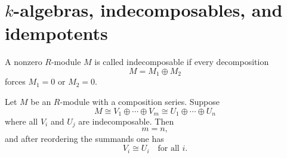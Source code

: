 \section{\texorpdfstring{$k$-algebras, indecomposables, and idempotents}{k-algebras, indecomposables, and idempotents}}

\begin{definition}
    A nonzero $R$-module $M$ is called indecomposable if every decomposition
    \[
        M = M_1 \oplus M_2
    \]
    forces $M_1=0$ or $M_2=0$.
\end{definition}

\begin{theorem} Let $M$ be an $R$-module with a composition series.
    Suppose
    \[
        M \cong V_1 \oplus \cdots \oplus V_m
        \cong
        U_1 \oplus \cdots \oplus U_n
    \]
    where all $V_i$ and $U_j$ are indecomposable.
    Then
    \[
        m=n,
    \]
    and after reordering the summands one has
    \[
        V_i \cong U_i
        \quad\text{for all } i.
    \]
\end{theorem}

